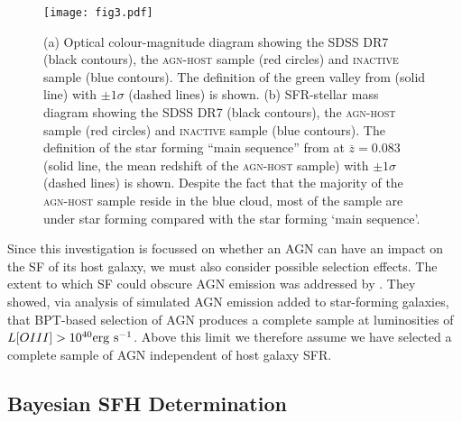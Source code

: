 \documentclass[useAMS,usenatbib]{mn2e}
\def\changed    {\color{nc} }
\def\changedbds    {\color{ncc} }
\def\newref    {\color{new} }
\begin{document}
\begin{figure}
\centering
\texttt{[image: fig3.pdf]}
\caption{{\newref (a) Optical colour-magnitude diagram showing the SDSS DR7 (black contours), the \textsc{agn-host} sample (red circles) and \textsc{inactive} sample (blue contours). The definition of the green valley from \citet{Baldry06} (solid line) with $\pm 1\sigma$ (dashed lines) is shown. (b) SFR-stellar mass diagram showing the SDSS DR7 (black contours), the \textsc{agn-host} sample (red circles) and \textsc{inactive} sample (blue contours). The definition of the star forming ``main sequence'' from \citet{Peng10} at $\overline{z}=0.083$ (solid line, the mean redshift of the \textsc{agn-host} sample) with $\pm 1\sigma$ (dashed lines) is shown. Despite the fact that the majority of the \textsc{agn-host} sample reside in the blue cloud, most of the sample are under star forming compared with the star forming `main sequence'.}}
\label{cmdsfms}
\end{figure}

Since this investigation is focussed on whether an AGN can have an impact on the SF of its host galaxy, we must also consider {\changed possible selection effects}. The extent to which SF {\changedbds could obscure AGN} emission was addressed by \cite{Sch2010}. They showed, via analysis of simulated AGN emission added to star-forming galaxies, that BPT-based selection of AGN produces a complete sample at luminosities of $L[OIII] > 10^{40} \rm{erg~s}^{-1}$. Above this limit we therefore assume we have selected a complete sample of AGN independent of host galaxy SFR.

\subsection{Bayesian SFH Determination}\label{starpy}

\end{document}
